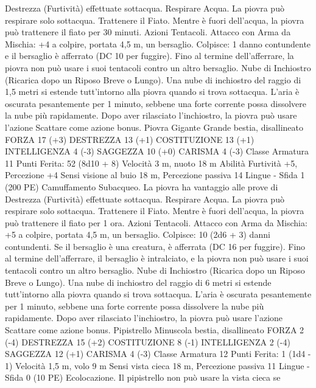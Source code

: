 \begin{multicols}{2}
Destrezza (Furtività) effettuate sottacqua.
Respirare Acqua. La piovra può respirare solo sottacqua.
Trattenere il Fiato. Mentre è fuori dell’acqua, la piovra può
trattenere il fiato per 30 minuti.
Azioni
Tentacoli. Attacco con Arma da Mischia: +4 a colpire, portata
4,5 m, un bersaglio.
Colpisce: 1 danno contundente e il bersaglio è afferrato (DC 10
per fuggire). Fino al termine dell’afferrare, la piovra non può
usare i suoi tentacoli contro un altro bersaglio.
Nube di Inchiostro (Ricarica dopo un Riposo Breve o Lungo).
Una nube di inchiostro del raggio di 1,5 metri si estende
tutt’intorno alla piovra quando si trova sottacqua. L’aria è
oscurata pesantemente per 1 minuto, sebbene una forte corrente
possa dissolvere la nube più rapidamente. Dopo aver rilasciato
l’inchiostro, la piovra può usare l’azione Scattare come azione
bonus.
Piovra Gigante
Grande bestia, disallineato
FORZA 17 (+3)
DESTREZZA 13 (+1)
COSTITUZIONE 13 (+1)
INTELLIGENZA 4 (-3)
SAGGEZZA 10 (+0)
CARISMA 4 (-3)
Classe Armatura 11
\hspace*{0pt}\hfill{Punti Ferita}: 52 (8d10 + 8)
Velocità 3 m, nuoto 18 m
Abilità Furtività +5, Percezione +4
Sensi visione al buio 18 m, Percezione passiva 14
Lingue -
Sfida 1 (200 PE)
Camuffamento Subacqueo. La piovra ha vantaggio alle prove di
Destrezza (Furtività) effettuate sottacqua.
Respirare Acqua. La piovra può respirare solo sottacqua.
Trattenere il Fiato. Mentre è fuori dell’acqua, la piovra può
trattenere il fiato per 1 ora.
Azioni
Tentacoli. Attacco con Arma da Mischia: +5 a colpire, portata
4,5 m, un bersaglio.
Colpisce: 10 (2d6 + 3) danni contundenti. Se il bersaglio è una
creatura, è afferrata (DC 16 per fuggire). Fino al termine
dell’afferrare, il bersaglio è intralciato, e la piovra non può usare
i suoi tentacoli contro un altro bersaglio.
Nube di Inchiostro (Ricarica dopo un Riposo Breve o Lungo).
Una nube di inchiostro del raggio di 6 metri si estende
tutt’intorno alla piovra quando si trova sottacqua. L’aria è
oscurata pesantemente per 1 minuto, sebbene una forte corrente
possa dissolvere la nube più rapidamente. Dopo aver rilasciato
l’inchiostro, la piovra può usare l’azione Scattare come azione
bonus.
Pipistrello
Minuscola bestia, disallineato
FORZA 2 (-4)
DESTREZZA 15 (+2)
COSTITUZIONE 8 (-1)
INTELLIGENZA 2 (-4)
SAGGEZZA 12 (+1)
CARISMA 4 (-3)
Classe Armatura 12
\hspace*{0pt}\hfill{Punti Ferita}: 1 (1d4 - 1)
Velocità 1,5 m, volo 9 m
Sensi vista cieca 18 m, Percezione passiva 11
Lingue -
Sfida 0 (10 PE)
Ecolocazione. Il pipistrello non può usare la vista cieca se

\end{multicols}
